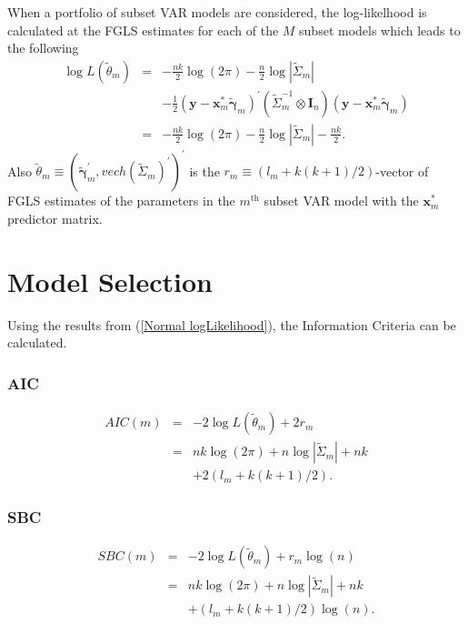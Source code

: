 When a portfolio of subset VAR models are considered, the log-likelhood
is calculated at the FGLS estimates for each of the $M$ subset models
which leads to the following
\begin{eqnarray}
\log L\left(\widetilde{\theta}_{m}\right) & = & -\frac{nk}{2}\log\left(2\pi\right)-\frac{n}{2}\log\left\vert \widetilde{\Sigma}_{m}\right\vert \nonumber \\
 &  & -\frac{1}{2}\left(\mathbf{y}-\mathbf{x}_{m}^{\ast}\widetilde{\mathbf{\gamma}}_{m}\right)^{\prime}\left(\widetilde{\Sigma}_{m}^{-1}\otimes\mathbf{I}_{n}\right)\left(\mathbf{y}-\mathbf{x}_{m}^{\ast}\widetilde{\mathbf{\gamma}}_{m}\right)\nonumber \\
 & = & -\frac{nk}{2}\log\left(2\pi\right)-\frac{n}{2}\log\left\vert \widetilde{\Sigma}_{m}\right\vert -\frac{nk}{2}.\label{Normal logLikelihood}
\end{eqnarray}
Also $\widetilde{\theta}_{m}\equiv\left(\widetilde{\mathbf{\gamma}}_{m}^{\prime},vech\left(\widetilde{\Sigma}_{m}\right)^{\prime}\right)^{\prime}$
is the $r_{m}\equiv\left(l_{m}+k\left(k+1\right)/2\right)$-vector
of FGLS estimates of the parameters in the $m^{\text{th}}$ subset
VAR model with the $\mathbf{x}_{m}^{\ast}$ predictor matrix.


\section{Model Selection}

Using the results from (\ref{Normal logLikelihood}), the Information
Criteria can be calculated.


\subsubsection{AIC}

\begin{eqnarray*}
AIC\left(m\right) & = & -2\log L\left(\widetilde{\theta}_{m}\right)+2r_{m}\\
 & = & nk\log\left(2\pi\right)+n\log\left\vert \widetilde{\Sigma}_{m}\right\vert +nk\\
 &  & +2\left(l_{m}+k\left(k+1\right)/2\right).
\end{eqnarray*}



\subsubsection{SBC}

\begin{eqnarray*}
SBC\left(m\right) & = & -2\log L\left(\widetilde{\theta}_{m}\right)+r_{m}\log\left(n\right)\\
 & = & nk\log\left(2\pi\right)+n\log\left\vert \widetilde{\Sigma}_{m}\right\vert +nk\\
 &  & +\left(l_{m}+k\left(k+1\right)/2\right)\log\left(n\right).
\end{eqnarray*}




